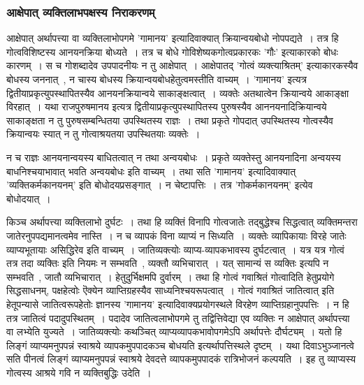 			\subsubsection{आक्षेपात् व्यक्तिलाभपक्षस्य निराकरणम्}

				आक्षेपात् अर्थापत्त्या वा व्यक्तिलाभोपगमे 'गामानय' इत्यादिवाक्यात् क्रियान्वयबोधो नोपपद्यते~। तत्र हि गोत्वविशिष्टस्य आनयनक्रिया बोध्यते~। तत्र च बोधे गोविशेष्यकगोत्वप्रकारकः 'गौः' इत्याकारको बोधः कारणम्~। स च गोशब्दादेव उपपादनीयः न तु आक्षेपात्~। आक्षेपातद् 'गोत्वं व्यक्त्याश्रितम्' इत्याकारकस्यैव बोधस्य जननात्~,  न चास्य बोधस्य क्रियान्वयबोधहेतुत्वमस्तीति वाच्यम्~। 'गामानय' इत्यत्र द्वितीयाप्रकृत्युपस्थापितस्यैव आनयनक्रियान्वये साकाङ्क्षत्वात्~। व्यक्तेः अतथात्वेन क्रियान्वये आकाङ्क्षा विरहात्~। यथा राजपुरुषमानय इत्यत्र  द्वितीयाप्रकृत्युपस्थापितस्य पुरुषस्यैव आननयनादिक्रियान्वये साकाङ्क्षता न तु पुरुषसम्बन्धितया उपस्थितस्य राज्ञः~। तथा प्रकृते गोपदात् उपस्थितस्य गोत्वस्यैव क्रियान्वयः स्यात् न तु गोत्वाश्रयतया उपस्थितयाः व्यक्तेः~।

				न च राज्ञः आनयनान्वयस्य बाधितत्वात् न तथा अन्वयबोधः~।  प्रकृते व्यक्तेस्तु आनयनादिना अन्वयस्य बाधनिश्चयाभावात्  भवति अन्वयबोधः  इति वाच्यम्~।  तथा सति ’गामानय’ इत्यादिवाक्यात् ’व्यक्तिकर्मकानयनम्’ इति बोधोदयप्रसङ्गात्~।  न चेष्टापत्तिः~।  तत्र ’गोकर्मकानयनम्’ इत्येव बोधोदयात्~। 

				किञ्च अर्थापत्त्या व्यक्तिलाभो दुर्घटः~।  तथा हि व्यक्तिं विनापि गोत्वजातेः तद्बुद्धेश्च सिद्धत्वात् व्यक्तिमन्तरा जातेरनुपपद्यमानत्वमेव नास्ति~।  न च व्यापकं विना व्याप्यं न सिध्यति~।  व्यक्तेः व्यापिकायाः विरहे जातेः व्याप्यभूतायाः असिद्धिरेव  इति वाच्यम्~।  जातिव्यक्त्योः  व्याप्य-व्यापकभावस्य दुर्घटत्वात्~।  यत्र यत्र गोत्वं तत्र तदा व्यक्तिः इति नियमः न सम्भवति~, व्यक्तौ व्यभिचारात्~।  यत् सामान्यं स व्यक्तिः इत्यपि न सम्भवति~, जातौ व्यभिचारात्~।  हेतुदुर्भिक्षमपि दुर्वारम्~।  तथा हि गोत्वं गवाश्रितं गोत्वादिति हेतुप्रयोगे सिद्धसाधनम्, पक्षहेत्वोः ऎक्येन  व्याप्तिग्रहस्यैव  साध्यनिश्चयरूपत्वात्~।  गोत्वं गवाश्रितं जातित्वात् इति हेतूपन्यासे  जातित्वरूपहेतोः ज्ञानस्य ’गामानय’  इत्यादिवाक्यप्रयोगस्थले विरहेण व्याप्तिग्रहानुपपत्तिः~।  न हि तत्र जातित्वं पदादुपस्थितम्~।  पदादेव जातित्वलाभोपगमे  तु तद्वित्तिवेद्या एव व्यक्तिः न आक्षेपात् अर्थापत्त्या वा लभ्येति युज्यते~।  जातिव्यक्त्योः कथञ्चित् व्याप्यव्यापकभावोपगमेऽपि अर्थापत्तेः दौर्घट्यम्~।  यतो हि लिङ्गं व्याप्यमनुपपन्नं स्वाश्रये व्यापकमुपपादकञ्च बोधयति इत्यर्थापत्तिस्थले दृष्टम्~।  यथा दिवाऽभुञ्जानत्वे सति पीनत्वं लिङ्गं व्याप्यमनुपपन्नं स्वाश्रये देवदत्ते व्यापकमुपपादकं रात्रिभोजनं कल्पयति~।  इह तु व्याप्यस्य गोत्वस्य आश्रये गवि न व्यक्तिबुद्धिः उदेति~। 
	

